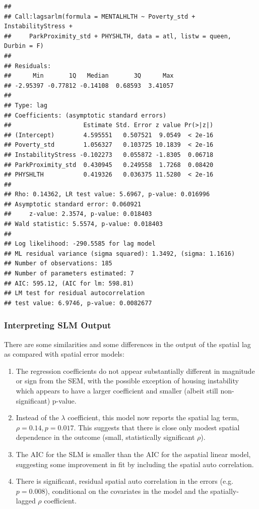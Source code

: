 \documentclass[
]{book}
\providecommand{\tightlist}{%
  \setlength{\itemsep}{0pt}\setlength{\parskip}{0pt}}
\begin{document}
\begin{lstlisting}
## 
## Call:lagsarlm(formula = MENTALHLTH ~ Poverty_std + InstabilityStress + 
##     ParkProximity_std + PHYSHLTH, data = atl, listw = queen,     Durbin = F)
## 
## Residuals:
##      Min       1Q   Median       3Q      Max 
## -2.95397 -0.77812 -0.14108  0.68593  3.41057 
## 
## Type: lag 
## Coefficients: (asymptotic standard errors) 
##                    Estimate Std. Error z value Pr(>|z|)
## (Intercept)        4.595551   0.507521  9.0549  < 2e-16
## Poverty_std        1.056327   0.103725 10.1839  < 2e-16
## InstabilityStress -0.102273   0.055872 -1.8305  0.06718
## ParkProximity_std  0.430945   0.249558  1.7268  0.08420
## PHYSHLTH           0.419326   0.036375 11.5280  < 2e-16
## 
## Rho: 0.14362, LR test value: 5.6967, p-value: 0.016996
## Asymptotic standard error: 0.060921
##     z-value: 2.3574, p-value: 0.018403
## Wald statistic: 5.5574, p-value: 0.018403
## 
## Log likelihood: -290.5585 for lag model
## ML residual variance (sigma squared): 1.3492, (sigma: 1.1616)
## Number of observations: 185 
## Number of parameters estimated: 7 
## AIC: 595.12, (AIC for lm: 598.81)
## LM test for residual autocorrelation
## test value: 6.9746, p-value: 0.0082677
\end{lstlisting}

\hypertarget{interpreting-slm-output}{%
\subsubsection{Interpreting SLM Output}\label{interpreting-slm-output}}

There are some similarities and some differences in the output of the spatial lag as compared with spatial error models:

\begin{enumerate}
\def\labelenumi{\arabic{enumi}.}
\tightlist
\item
  The regression coefficients do not appear substantially different in magnitude or sign from the SEM, with the possible exception of housing instability which appears to have a larger coefficient and smaller (albeit still non-significant) p-value.
\item
  Instead of the \(\lambda\) coefficient, this model now reports the spatial lag term, \(\rho=0.14, p = 0.017\). This suggests that there is close only modest spatial dependence in the outcome (small, statistically significant \(\rho\)).
\item
  The AIC for the SLM is smaller than the AIC for the aspatial linear model, suggesting some improvement in fit by including the spatial auto correlation.
\item
  There is significant, residual spatial auto correlation in the errors (e.g.~\(p=0.008\)), conditional on the covariates in the model and the spatially-lagged \(\rho\) coefficient.
\end{enumerate}
\end{document}
